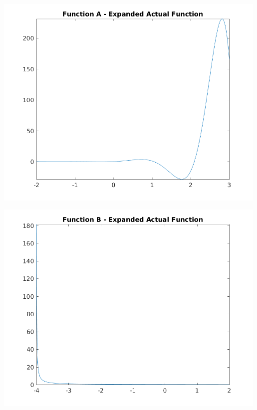 \documentclass{article}
\begin{document}
\begin{center}
    \centering
    \begin{minipage}{0.5\textwidth}
        \centering
        \includegraphics[width=0.99\textwidth]{../output/a_expanded_actual.png}
    \end{minipage}\hfill
    \begin{minipage}{0.5\textwidth}
        \centering
        \includegraphics[width=0.99\textwidth]{../output/b_expanded_actual.png}
    \end{minipage}
	\label{fig:expanded}

\end{center}



\newpage


\end{document}
